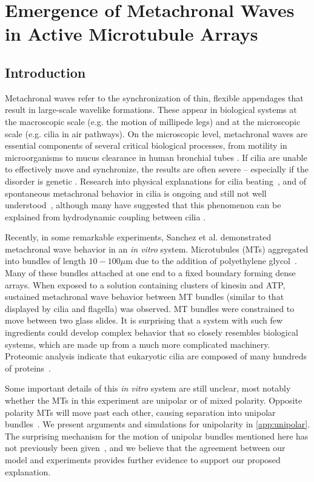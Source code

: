 \documentclass[11pt]{ucthesis}
\begin{document}
\chapter{Emergence of Metachronal Waves in Active Microtubule Arrays}

\section{Introduction}
Metachronal waves refer to the synchronization of thin, flexible
appendages that result in large-scale wavelike formations. These
appear in biological systems at the macroscopic scale (e.g. the
motion of millipede legs) and at the microscopic scale (e.g. cilia
in air pathways). On the microscopic level, metachronal waves are
essential components of several critical biological processes, from
motility in microorganisms to mucus clearance in human bronchial
tubes \cite{Afzelius2004,Okada2005}. If cilia are unable to effectively
move and synchronize, the results are often severe -- especially
if the disorder is genetic \cite{Afzelius2004}. Research into
physical explanations for cilia beating~\cite{brokaw1975molecular}, and of spontaneous metachronal behavior in cilia
is ongoing and still not well understood~\cite{camalet1999self,lindemann2010flagellar}, although many have suggested
that this phenomenon can be explained from hydrodynamic coupling
between cilia \cite{Sleigh1969,Sleigh1974,Gheber1989,Gueron1997}.

Recently, in some remarkable experiments, Sanchez et al. demonstrated metachronal wave behavior in
an \textit{in vitro} system\cite{Sanchez2011,sanchez2013engineering}.  
Microtubules (MTs) aggregated into bundles of length $10-100 \mu\mathrm{m}$ due to the addition of
polyethylene glycol~\cite{needleman2004synchrotron}.
Many of these bundles attached at one end
to a fixed boundary forming dense arrays. When exposed to a solution
containing clusters of kinesin and ATP, sustained metachronal wave
behavior between MT bundles (similar to that displayed by cilia and
flagella) was observed. MT bundles were constrained to move between
two glass slides. It is surprising that a system with such few ingredients
could develop complex behavior that so closely
resembles biological systems, which are made up from a much
more complicated machinery. Proteomic analysis indicate that eukaryotic cilia are
composed of many hundreds of proteins~\cite{pazour2005proteomic}.

Some important details of this
\textit{in vitro} system are still unclear, most notably whether the
MTs in this experiment are unipolar or of mixed polarity. 
Opposite polarity MTs will move past each other, causing separation
into unipolar bundles~\cite{kruse2000actively,liverpool2003instabilities}. 
We present arguments and simulations for unipolarity in 
\ref{app:unipolar}.
The surprising mechanism for the motion of unipolar bundles mentioned here
has not previously been given~\cite{Sanchez2011,sanchez2013engineering}, 
and we believe that the agreement between our model and
experiments provides further evidence to support our proposed explanation. 
\end{document}
